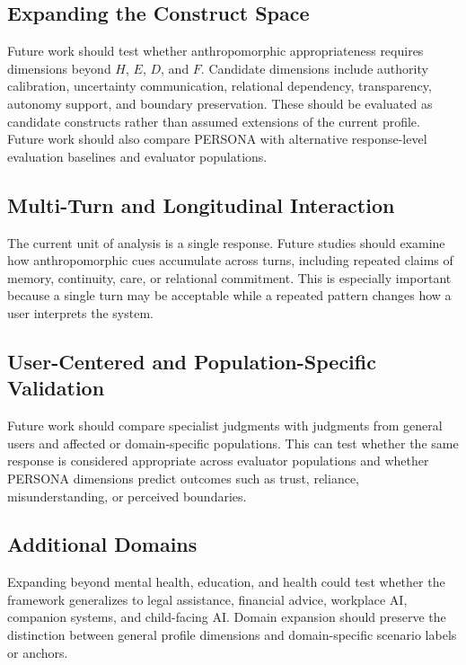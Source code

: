 \documentclass[manuscript,review,anonymous]{acmart}
\begin{document}
\subsection{Expanding the Construct Space}

Future work should test whether anthropomorphic appropriateness requires dimensions beyond $H$, $E$, $D$, and $F$. Candidate dimensions include authority calibration, uncertainty communication, relational dependency, transparency, autonomy support, and boundary preservation. These should be evaluated as candidate constructs rather than assumed extensions of the current profile. Future work should also compare PERSONA with alternative response-level evaluation baselines and evaluator populations.

\subsection{Multi-Turn and Longitudinal Interaction}

The current unit of analysis is a single response. Future studies should examine how anthropomorphic cues accumulate across turns, including repeated claims of memory, continuity, care, or relational commitment. This is especially important because a single turn may be acceptable while a repeated pattern changes how a user interprets the system.

\subsection{User-Centered and Population-Specific Validation}

Future work should compare specialist judgments with judgments from general users and affected or domain-specific populations. This can test whether the same response is considered appropriate across evaluator populations and whether PERSONA dimensions predict outcomes such as trust, reliance, misunderstanding, or perceived boundaries.

\subsection{Additional Domains}

Expanding beyond mental health, education, and health could test whether the framework generalizes to legal assistance, financial advice, workplace AI, companion systems, and child-facing AI. Domain expansion should preserve the distinction between general profile dimensions and domain-specific scenario labels or anchors.
\end{document}
